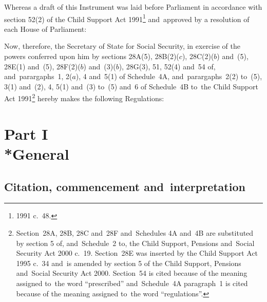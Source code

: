 \documentclass[12pt,a4paper]{article}
\title{\regstitle}
\author{S.I.\ 2001 No.\ 156}
\date{Made
18th January 2001\\
Coming into~force
as provided in regulation~1(1)
}
\begin{document}
\maketitle


\medskip

\noindent
Whereas a draft of this Instrument was laid before Parliament in accordance with section 52(2) of the Child Support Act 1991\footnote{1991 c.\ 48.} and~approved by a resolution of each House of Parliament:

Now, therefore, the Secretary of State for Social Security, in exercise of the powers conferred upon him by sections 28A(5), 28B(2)($c$), 28C(2)($b$)  and~(5), 28E(1) and~(5), 28F(2)($b$)  and~(3)($b$), 28G(3), 51, 52(4) and~54 of, and~parargaphs~1, 2($a$), 4 and~5(1) of Schedule~4A, and~parargaphs~2(2) to~(5), 3(1) and~(2), 4, 5(1) and~(3) to~(5) and~6 of Schedule~4B to~the Child Support Act 1991\footnote{Section~28A, 28B, 28C and~28F and~Schedules 4A and~4B are substituted by section 5 of, and~Schedule~2 to, the Child Support, Pensions and~Social Security Act 2000 c.\ 19. Section~28E was inserted by the Child Support Act 1995 c.\ 34 and~is amended by section 5 of the Child Support, Pensions and~Social Security Act 2000. Section~54 is cited because of the meaning assigned to~the word “prescribed” and~Schedule~4A paragraph~1 is cited because of the meaning assigned to~the word “regulations”.} hereby makes the following Regulations: 

{\sloppy

\tableofcontents

}

\bigskip

\setcounter{secnumdepth}{-2}

\section[Part I --- General]{Part I\\*General}

\renewcommand\parthead{--- Part I}

\subsection[1. Citation, commencement and~interpretation]{Citation, commencement and~interpretation}
\end{document}
